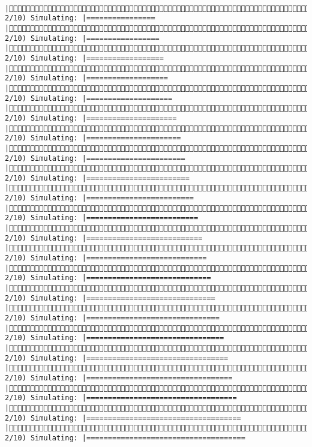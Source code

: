 \documentclass[]{article}
\begin{document}
\begin{verbatim}
             |( 2/10) Simulating: |================                                     |( 2/10) Simulating: |=================                                    |( 2/10) Simulating: |==================                                   |( 2/10) Simulating: |===================                                  |( 2/10) Simulating: |====================                                 |( 2/10) Simulating: |=====================                                |( 2/10) Simulating: |======================                               |( 2/10) Simulating: |=======================                              |( 2/10) Simulating: |========================                             |( 2/10) Simulating: |=========================                            |( 2/10) Simulating: |==========================                           |( 2/10) Simulating: |===========================                          |( 2/10) Simulating: |============================                         |( 2/10) Simulating: |=============================                        |( 2/10) Simulating: |==============================                       |( 2/10) Simulating: |===============================                      |( 2/10) Simulating: |================================                     |( 2/10) Simulating: |=================================                    |( 2/10) Simulating: |==================================                   |( 2/10) Simulating: |===================================                  |( 2/10) Simulating: |====================================                 |( 2/10) Simulating: |=====================================                
\end{verbatim}
\end{document}
